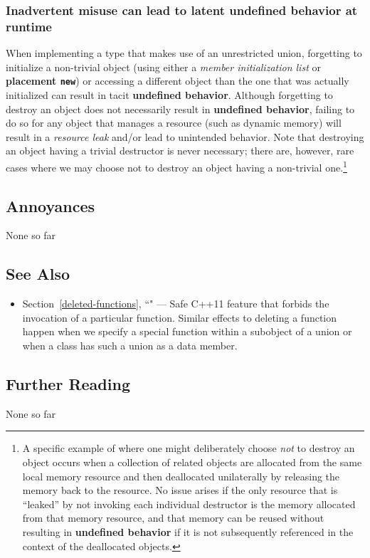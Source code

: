 \subsubsection[Inadvertent misuse can lead to latent \textbf{undefined behavior}\glossary{undefined behavior} at runtime]{Inadvertent misuse can lead to latent \textbf{undefined behavior} at runtime}\label{inadvertent-misuse-can-lead-to-latent-undefined-behavior-at-runtime}

When implementing a type that makes use of an unrestricted union,
forgetting to initialize a non-trivial object (using either a
\emph{member initialization list} or \textbf{placement \texttt{new}}) or
accessing a different object than the one that was actually initialized
can result in tacit \textbf{undefined behavior}. Although forgetting to
destroy an object does not necessarily result in \textbf{undefined
behavior}, failing to do so for any object that manages a resource (such
as dynamic memory) will result in a \emph{resource leak} and/or lead to
unintended behavior. Note that destroying an
object having a trivial destructor is never necessary; there are, however, rare cases where
we may choose not to destroy an object having a non-trivial
one.{\cprotect\footnote{A specific example of where one might
deliberately choose \emph{not} to destroy an object occurs when a
collection of related objects are allocated from the same local memory
resource and then deallocated unilaterally by releasing the memory
back to the resource. No issue arises if the only resource that is ``leaked''
by not invoking each individual destructor is the memory allocated
from that memory resource, and that memory can be
reused without resulting in \textbf{undefined behavior} if it
is not subsequently referenced in the context of the deallocated
  objects.}}

\subsection[Annoyances]{Annoyances}\label{annoyances}

None so far

\subsection[See Also]{See Also}\label{see-also}

\begin{itemize}
\item{Section~\ref{deleted-functions}, ``" — Safe C++11 feature that forbids the invocation of a particular function. Similar effects to deleting a function happen when we specify a special function within a subobject of a union or when a class has such a union as a data member.}
\end{itemize}

\subsection[Further Reading]{Further Reading}\label{further-reading}

None so far


